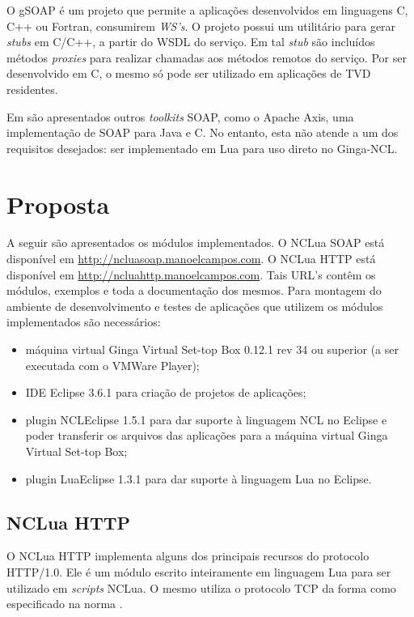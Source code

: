 O gSOAP é um projeto que permite a aplicações desenvolvidos em linguagens C, C++ ou Fortran,  
consumirem \textit{WS's}\cite{van2005gsoap}. O projeto possui um utilitário para gerar \textit{stubs} em C/C++, a partir do WSDL do serviço. Em tal \textit{stub} são incluídos métodos \textit{proxies} para realizar chamadas aos métodos remotos do serviço. 
Por ser desenvolvido em C, o mesmo só pode ser utilizado
em aplicações de TVD residentes.

Em \cite{davis2005latency} são apresentados outros \textit{toolkits} SOAP, como o Apache Axis, uma implementação de SOAP para Java e C. No entanto, esta não atende a um dos requisitos desejados: ser implementado em Lua para uso direto no Ginga-NCL.

\section{Proposta} \label{sec:modulos-implementados}

A seguir são apresentados os módulos implementados.
O NCLua SOAP está disponível em \url{http://ncluasoap.manoelcampos.com}. 
O NCLua HTTP está disponível em \url{http://ncluahttp.manoelcampos.com}. 
Tais URL's contêm os módulos, exemplos e toda a documentação dos mesmos.
Para montagem do ambiente de desenvolvimento e testes de aplicações que utilizem
os módulos implementados são necessários:
\begin{itemize}
	\item máquina virtual Ginga Virtual Set-top Box 0.12.1 rev 34 ou superior (a ser executada com o VMWare Player);
	\item IDE Eclipse 3.6.1 para criação de projetos de aplicações;
	\item plugin NCLEclipse 1.5.1 para dar suporte à linguagem NCL no Eclipse e poder transferir
	os arquivos das aplicações para a máquina virtual Ginga Virtual Set-top Box;
	\item plugin LuaEclipse 1.3.1 para dar suporte à linguagem Lua no Eclipse.
\end{itemize}

\subsection{NCLua HTTP} \label{sec:ncluahttp}

O NCLua HTTP implementa alguns dos principais recursos do protocolo HTTP/1.0. 
Ele é um módulo escrito inteiramente em linguagem Lua
para ser utilizado em \textit{scripts} NCLua. 
O mesmo utiliza o protocolo TCP da forma como especificado na norma \cite{abnt200815606}.

